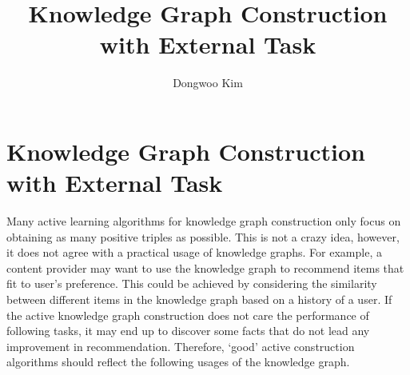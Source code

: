 \documentclass{article} %
\title{Knowledge Graph Construction with External Task}
\author{
Dongwoo Kim
}
\theoremstyle{definition}
\begin{document}
\maketitle


\section{Knowledge Graph Construction with External Task}

Many active learning algorithms for knowledge graph construction only focus on obtaining as many positive triples as possible. This is not a crazy idea, however, it does not agree with a practical usage of knowledge graphs. For example, a content provider may want to use the knowledge graph to recommend items that fit to user's preference. This could be achieved by considering the similarity between different items in the knowledge graph based on a history of a user. If the active knowledge graph construction does not care the performance of following tasks, it may end up to discover some facts that do not lead any improvement in recommendation. Therefore, `good' active construction algorithms should reflect the following usages of the knowledge graph.
\end{document}

